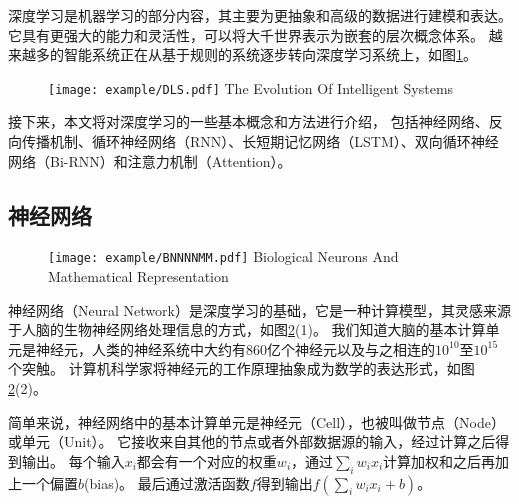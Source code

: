 深度学习是机器学习的部分内容，其主要为更抽象和高级的数据进行建模和表达。
它具有更强大的能力和灵活性，可以将大千世界表示为嵌套的层次概念体系。
越来越多的智能系统正在从基于规则的系统逐步转向深度学习系统上，如图\ref{fig:DLS}。

\begin{figure}[!htp]
  \centering
  \texttt{[image: example/DLS.pdf]}
    {The Evolution Of Intelligent Systems}
  \label{fig:DLS}
\end{figure}

接下来，本文将对深度学习的一些基本概念和方法进行介绍，
包括神经网络、反向传播机制、循环神经网络（RNN）、长短期记忆网络（LSTM）、双向循环神经网络（Bi-RNN）和注意力机制（Attention）。

\subsection{神经网络}

\begin{figure}[!htp]
  \centering
  \texttt{[image: example/BNNNNMM.pdf]}
    {Biological Neurons And Mathematical Representation}
  \label{fig:BNNNNMM}
\end{figure}

神经网络（Neural Network）是深度学习的基础，它是一种计算模型，其灵感来源于人脑的生物神经网络处理信息的方式，如图\ref{fig:BNNNNMM}(1)。
我们知道大脑的基本计算单元是神经元，人类的神经系统中大约有860亿个神经元以及与之相连的$10^{10}$至$10^{15}$个突触。
计算机科学家将神经元的工作原理抽象成为数学的表达形式，如图\ref{fig:BNNNNMM}(2)。


简单来说，神经网络中的基本计算单元是神经元（Cell），也被叫做节点（Node）或单元（Unit）。
它接收来自其他的节点或者外部数据源的输入，经过计算之后得到输出。
每个输入$x_i$都会有一个对应的权重$w_i$，通过$\sum_i w_ix_i$计算加权和之后再加上一个偏置$b$(bias)。
最后通过激活函数$f$得到输出$f(\sum_i w_ix_i +b)$。


